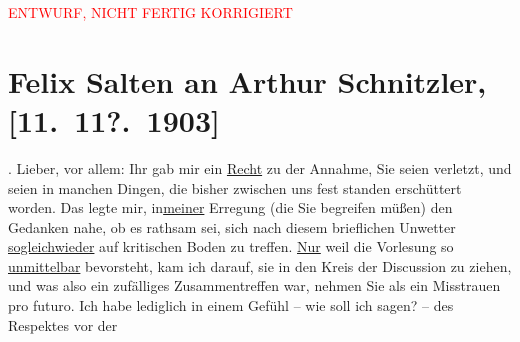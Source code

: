 
\begin{center}
            \textcolor{red}{ENTWURF, NICHT FERTIG KORRIGIERT}
                      \end{center}
            
         \renewcommand{\erwaehnteOrte}{Orte: Semmering, Wien}
         \renewcommand{\erwaehnteWerke}{}
               \section[Felix Salten an Arthur Schnitzler, {[}11. 11?. 1903{]}]{ Felix Salten an Arthur Schnitzler, {[}11. 11?. 1903{]}}\nopagebreak{}\rehead{ }\begin{ledgroupsized}[t]{13cm}\normalsize\beginnumbering \toendnotes[C]{\smallbreak\pagebreak[2]} 
\toendnotes[C]{\smallbreak}\pstart
           {\pb}\label{K_L03355-1v}\label{K_L03355-1h}.\pend
           \pstart
           Lieber, vor allem: Ihr \label{K_L03355-111v}\label{K_L03355-111h} gab mir ein \uline{Recht} zu der Annahme,
               Sie seien verletzt, und seien in manchen Dingen, die bisher zwischen uns fest standen
               erschüttert worden. Das legte mir, in\uline{meiner} Erregung
               (die Sie begreifen müßen) den Gedanken nahe, ob es rathsam sei, sich nach diesem
               brieflichen Unwetter \uline{sogleich}\uline{wieder} auf kritischen Boden zu treffen. \uline{Nur} weil die Vorlesung so \uline{unmittelbar} bevorsteht, kam ich darauf, sie in den Kreis der Discussion zu
               ziehen, und was also ein zufälliges Zusammentreffen war, nehmen Sie als ein
               Misstrauen pro futuro. \pend
           \pstart
           Ich habe lediglich in einem Gefühl – wie soll ich sagen? – des Respektes vor der

\end{ledgroupsized}
